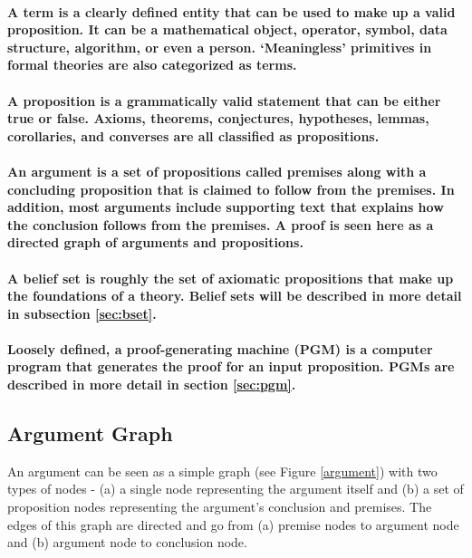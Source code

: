 \documentclass[a4paper]{article}
\begin{document}
\paragraph{A \textbf{term} is a clearly defined entity that can be used to make up a valid proposition. It can be a mathematical object, operator, symbol, data structure, algorithm, or even a person. `Meaningless' primitives in formal theories are also categorized as terms.}

\paragraph{A \textbf{proposition} is a grammatically valid statement that can be either true or false. Axioms, theorems, conjectures, hypotheses, lemmas, corollaries, and converses are all classified as propositions.}

\paragraph{An \textbf{argument} is a set of propositions called premises along with a concluding proposition that is claimed to follow from the premises. In addition, most arguments include supporting text that explains how the conclusion follows from the premises. A proof is seen here as a directed graph of arguments and propositions.}

\paragraph{A \textbf{belief set} is roughly the set of axiomatic propositions that make up the foundations of a theory. Belief sets will be described in more detail in subsection \ref{sec:bset}.}

\paragraph{Loosely defined, a \textbf{proof-generating machine} (PGM) is a computer program that generates the proof for an input proposition. PGMs are described in more detail in section \ref{sec:pgm}.}

\subsection{Argument Graph}
An argument can be seen as a simple graph (see Figure \ref{argument}) with two types of nodes - (a) a single node representing the argument itself and (b) a set of proposition nodes representing the argument's conclusion and premises. The edges of this graph are directed and go from (a) premise nodes to argument node and (b) argument node to conclusion node.
\end{document}

